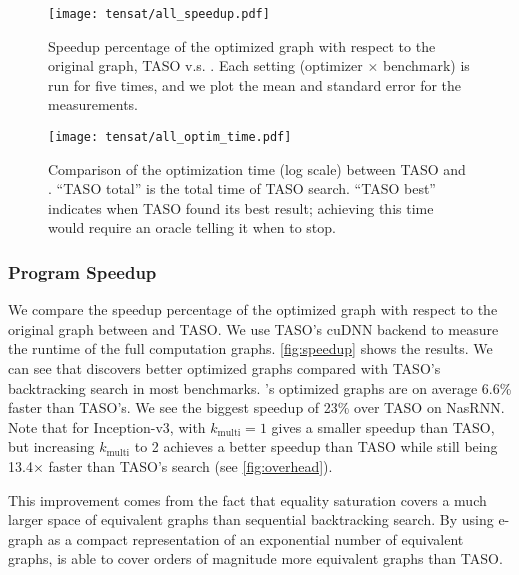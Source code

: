 \begin{figure}
\begin{minipage}[t]{0.48\textwidth}
    \centering
    \texttt{[image: tensat/all\_speedup.pdf]}
    \caption{
        Speedup percentage of the optimized graph with respect to the original graph, TASO v.s. \ourname{}.
        Each setting (optimizer $\times$ benchmark) is run for five times, and we plot the mean and standard error for the measurements.
    }
    \label{fig:speedup}
\end{minipage}
\hfill
\begin{minipage}[t]{0.48\textwidth}
    \centering
    \texttt{[image: tensat/all\_optim\_time.pdf]}
    \caption{
        Comparison of the optimization time (log scale) between TASO and \ourname{}.
        ``TASO total'' is the total time of TASO search.
        ``TASO best'' indicates when TASO found its best result;
        achieving this time would require an oracle telling it when to stop.
    }
    \label{fig:overhead}
\end{minipage}
\end{figure}

\subsubsection{Program Speedup}
\label{sec:speedup}

We compare the speedup percentage of the optimized graph with respect to the original graph between \ourname{} and TASO.
We use TASO's cuDNN backend to measure the runtime of the full computation graphs.
\autoref{fig:speedup} shows the results.
We can see that \ourname{} discovers better optimized graphs compared with TASO's backtracking search in most benchmarks.
\ourname{}'s optimized graphs are on average 6.6\% faster than TASO's. We see the biggest speedup of 23\% over TASO on NasRNN.
Note that for Inception-v3, \ourname{} with $k_{\textrm{multi}}=1$ gives a smaller speedup than TASO,
but increasing $k_{\textrm{multi}}$ to 2 achieves a better speedup than TASO
while still being 13.4$\times$ faster than TASO's search (see \autoref{fig:overhead}).

This improvement comes from the fact that equality saturation covers a much larger space of equivalent graphs than sequential backtracking search.
By using e-graph as a compact representation of an exponential number of equivalent graphs, \ourname{} is able to cover orders of magnitude more equivalent graphs than TASO.

